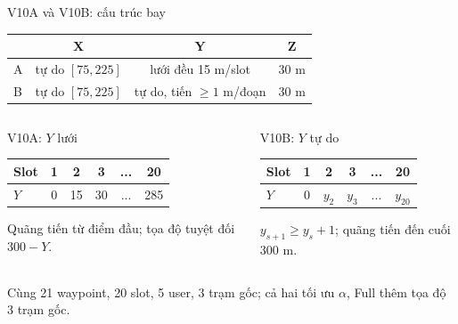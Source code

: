 \documentclass[t,aspectratio=169]{beamer}
\begin{document}
\begin{frame}{V10A và V10B: cấu trúc bay}
  \centering\scriptsize
  \setlength{\tabcolsep}{5pt}
  \begin{tabular}{@{}l c c c@{}}
    \toprule
    & \textbf{X} & \textbf{Y} & \textbf{Z}\\
    \midrule
    A & tự do $[75,225]$ & lưới đều 15 m/slot & 30 m\\
    B & tự do $[75,225]$ & tự do, tiến $\ge1$ m/đoạn & 30 m\\
    \bottomrule
  \end{tabular}
  \vspace{4pt}
  \begin{columns}[T]
  \begin{block}{V10A: $Y$ lưới}\scriptsize
  \begin{tabular}{@{}l c c c c c@{}}
    \toprule
    Slot & 1 & 2 & 3 & ... & 20\\
    \midrule
    \(Y\) & 0 & 15 & 30 & ... & 285\\
    \bottomrule
  \end{tabular}\par
  \vspace{2pt}
  {\tiny Quãng tiến từ điểm đầu; tọa độ tuyệt đối \(300-Y\).}
  \end{block}
  \begin{block}{V10B: $Y$ tự do}\scriptsize
  \begin{tabular}{@{}l c c c c c@{}}
    \toprule
    Slot & 1 & 2 & 3 & ... & 20\\
    \midrule
    \(Y\) & 0 & \(y_2\) & \(y_3\) & ... & \(y_{20}\)\\
    \bottomrule
  \end{tabular}\par
  \vspace{2pt}
  {\tiny \(y_{s+1}\ge y_s+1\); quãng tiến đến cuối 300 m.}
  \end{block}
  \end{columns}
  \vspace{2pt}
  {\scriptsize Cùng 21 waypoint, 20 slot, 5 user, 3 trạm gốc; cả hai tối ưu \(\alpha\), Full thêm tọa độ 3 trạm gốc.}
\end{frame}
\end{document}
